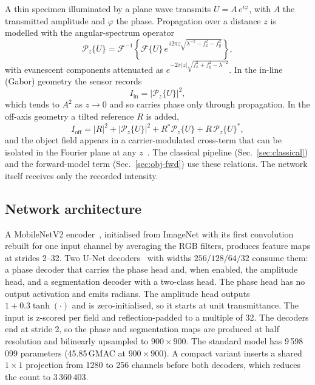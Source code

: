 \documentclass[11pt]{article}
\begin{document}
A thin specimen illuminated by a plane wave transmits $U = A\,e^{i\varphi}$,
with $A$ the transmitted amplitude and $\varphi$ the phase. Propagation over a
distance $z$ is modelled with the angular-spectrum operator
\begin{equation}
\mathcal{P}_z\{U\} = \mathcal{F}^{-1}\!\left\{
\mathcal{F}\{U\}\,
e^{\,i 2\pi z \sqrt{\lambda^{-2}-f_x^2-f_y^2}}\right\},
\label{eq:angular-spectrum}
\end{equation}
with evanescent components attenuated as $e^{-2\pi|z|\sqrt{f_x^2+f_y^2-\lambda^{-2}}}$.
In the in-line (Gabor) geometry the sensor records
\begin{equation}
I_\mathrm{in} = \left|\mathcal{P}_z\{U\}\right|^2 ,
\label{eq:inline}
\end{equation}
which tends to $A^2$ as $z\rightarrow0$ and so carries phase only through
propagation. In the off-axis geometry a tilted reference $R$ is added,
\begin{equation}
I_\mathrm{off} = |R|^2 + |\mathcal{P}_z\{U\}|^2 + R^{*}\mathcal{P}_z\{U\} + R\,\mathcal{P}_z\{U\}^{*},
\label{eq:offaxis}
\end{equation}
and the object field appears in a carrier-modulated cross-term that can be
isolated in the Fourier plane at any $z$~\cite{cuche1999}. The classical
pipeline (Sec.~\ref{sec:classical}) and the forward-model term
(Sec.~\ref{sec:obj-fwd}) use these relations. The network itself receives only
the recorded intensity.

\subsection{Network architecture}
\label{sec:network}

A MobileNetV2 encoder~\cite{sandler2018mobilenetv2}, initialised from ImageNet
with its first convolution rebuilt for one input channel by averaging the RGB
filters, produces feature maps at strides 2--32. Two U-Net
decoders~\cite{ronneberger2015unet} with widths $256/128/64/32$ consume them: a
phase decoder that carries the phase head and, when enabled, the amplitude
head, and a segmentation decoder with a two-class head. The phase head has no
output activation and emits radians. The amplitude head outputs
$1 + 0.3\tanh(\cdot)$ and is zero-initialised, so it starts at unit
transmittance. The input is z-scored per field and reflection-padded to a
multiple of 32. The decoders end at stride 2, so the phase and segmentation maps
are produced at half resolution and bilinearly upsampled to $900\times900$. The
standard model has 9\,598\,099 parameters (45.85\,GMAC at $900\times900$). A
compact variant inserts a shared $1\times1$ projection from 1280 to 256 channels
before both decoders, which reduces the count to 3\,360\,403.
\end{document}
